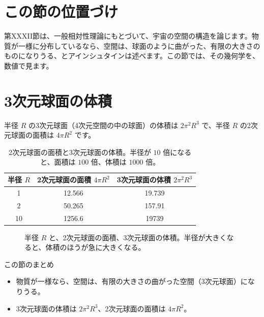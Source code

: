\documentclass[a4paper,11pt,openany]{ltjsbook}
\begin{document}
\section{この節の位置づけ}

第XXXII節は、一般相対性理論にもとづいて、宇宙の空間の構造を論じます。物質が一様に分布しているなら、空間は、球面のように曲がった、有限の大きさのものになりうる、とアインシュタインは述べます。この節では、その幾何学を、数値で見ます。

\section{3次元球面の体積}

半径 $R$ の3次元球面（4次元空間の中の球面）の体積は $2\pi^2R^3$ で、半径 $R$ の2次元球面の面積は $4\pi R^2$ です。

\begin{table}[htbp]
\centering
\begin{tabular}{c|cc}
\toprule
半径 $R$ & 2次元球面の面積 $4\pi R^2$ & 3次元球面の体積 $2\pi^2R^3$\\
\midrule
1 & 12.566 & 19.739\\
2 & 50.265 & 157.91\\
10 & 1256.6 & 19739\\
\bottomrule
\end{tabular}
\caption{2次元球面の面積と3次元球面の体積。半径が $10$ 倍になると、面積は $100$ 倍、体積は $1000$ 倍。}
\end{table}

\begin{figure}[htbp]
\centering
{}
\caption{半径 $R$ と、2次元球面の面積、3次元球面の体積。半径が大きくなると、体積のほうが急に大きくなる。}
\end{figure}

\begin{pointbox}{この節のまとめ}
\begin{itemize}[leftmargin=*]
\item 物質が一様なら、空間は、有限の大きさの曲がった空間（3次元球面）になりうる。
\item 3次元球面の体積は $2\pi^2R^3$、2次元球面の面積は $4\pi R^2$。
\end{itemize}
\end{pointbox}
\end{document}
